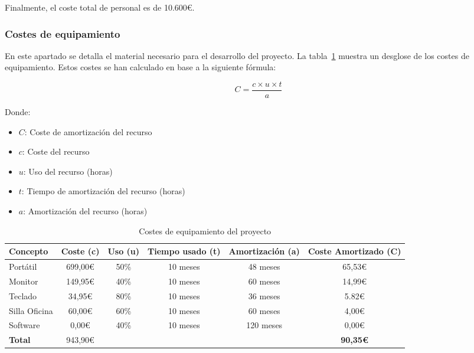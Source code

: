 Finalmente, el coste total de personal es de 10.600\euro.

\subsubsection{Costes de equipamiento}
En este apartado se detalla el material necesario para el desarrollo del proyecto. La tabla~\ref{tab:material} muestra un desglose de los costes de equipamiento. Estos costes se han calculado en base a la siguiente fórmula:

\[C = \frac{c\times u\times t}{a}\]

Donde:
\begin{itemize}
    \item $C$: Coste de amortización del recurso
    \item $c$: Coste del recurso
    \item $u$: Uso del recurso (horas)
    \item $t$: Tiempo de amortización del recurso (horas)
    \item $a$: Amortización del recurso (horas)
\end{itemize}


\begin{table}[H]
    \begin{adjustbox}{max width=\textwidth}
    \centering
    \begin{tabular}{@{}lccccc@{}}
    \toprule
    \textbf{Concepto} & \multicolumn{1}{l}{\textbf{Coste (c)}} & \multicolumn{1}{l}{\textbf{Uso (u)}} & \multicolumn{1}{l}{\textbf{Tiempo usado (t)}} & \multicolumn{1}{l}{\textbf{Amortización (a)}} & \multicolumn{1}{l}{\textbf{Coste Amortizado (C)}} \\ \midrule
 Portátil       & 699,00\euro  & 50\%   & 10 meses     & 48 meses     & 65,53\euro     \\
 Monitor        & 149,95\euro  & 40\%   & 10 meses     & 60 meses     & 14,99\euro     \\
 Teclado        & 34,95\euro   & 80\%   & 10 meses     & 36 meses     & 5.82\euro   \\
 Silla Oficina  & 60,00\euro   & 60\%   & 10 meses     & 60 meses     & 4,00\euro   \\
 Software       & 0,00\euro    & 40\%   & 10 meses     & 120 meses    & 0,00\euro   \\ \midrule
 \textbf{Total} & 943,90\euro  &        &              &              & \textbf{90,35\euro}    \\ \bottomrule
    \end{tabular}
    \end{adjustbox}
    \caption{Costes de equipamiento del proyecto}\label{tab:material}
\end{table}

